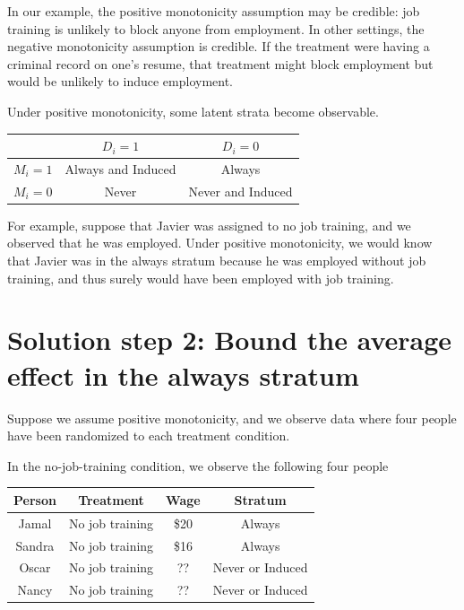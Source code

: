 \documentclass[
]{book}
\begin{document}
In our example, the positive monotonicity assumption may be credible: job training is unlikely to block anyone from employment. In other settings, the negative monotonicity assumption is credible. If the treatment were having a criminal record on one's resume, that treatment might block employment but would be unlikely to induce employment.

Under positive monotonicity, some latent strata become observable.

\begin{longtable}[]{@{}ccc@{}}
\toprule\noalign{}
& \(D_i = 1\) & \(D_i = 0\) \\
\midrule\noalign{}
\endhead
\bottomrule\noalign{}
\endlastfoot
\(M_i = 1\) & Always and Induced & Always \\
\(M_i = 0\) & Never & Never and Induced \\
\end{longtable}

For example, suppose that Javier was assigned to no job training, and we observed that he was employed. Under positive monotonicity, we would know that Javier was in the always stratum because he was employed without job training, and thus surely would have been employed with job training.

\hypertarget{solution-step-2-bound-the-average-effect-in-the-always-stratum}{%
\section{Solution step 2: Bound the average effect in the always stratum}\label{solution-step-2-bound-the-average-effect-in-the-always-stratum}}

Suppose we assume positive monotonicity, and we observe data where four people have been randomized to each treatment condition.

In the no-job-training condition, we observe the following four people

\begin{longtable}[]{@{}cccc@{}}
\toprule\noalign{}
Person & Treatment & Wage & Stratum \\
\midrule\noalign{}
\endhead
\bottomrule\noalign{}
\endlastfoot
Jamal & No job training & \$20 & Always \\
Sandra & No job training & \$16 & Always \\
Oscar & No job training & ?? & Never or Induced \\
Nancy & No job training & ?? & Never or Induced \\
\end{longtable}
\end{document}
